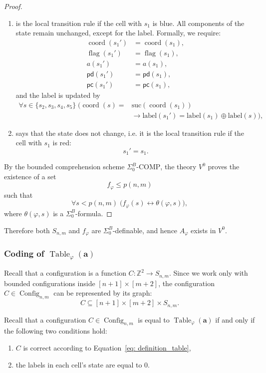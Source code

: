 \documentclass{article}
\theoremstyle{plain}
\theoremstyle{definition}
\DeclareMathOperator{\Config}{Config}
\DeclareMathOperator{\Table}{Table}
\DeclareMathOperator{\flag}{flag}
\DeclareMathOperator{\coord}{coord}
\newcommand{\pc}{\mathsf{pc}}
\newcommand{\pd}{\mathsf{pd}}
\newcommand{\tuple}{\mathbf}
\begin{document}
\begin{proof}
\begin{enumerate}[label={(\arabic*)}]
\item is the local transition rule if the cell with $s_1$ is blue. All components of the state remain unchanged, except for the label. 
Formally, we require:
\begin{align*}
    \coord(s_1') &= \coord(s_1),\\
    \flag(s_1') &= \flag(s_1),\\
    a(s_1') &= a(s_1),\\
    \pd(s_1') &= \pd(s_1),\\
    \pc(s_1') &= \pc(s_1),
\end{align*}
and the label is updated by
\begin{align*}
    \forall s \in \{s_2, s_3, s_4, s_5 \} \; \bigl(\coord(s)= & \mathrm{suc}(\coord(s_1)) \\& \rightarrow \mathrm{label}(s_1') 
    = \mathrm{label}(s_1) \oplus \mathrm{label}(s)\bigr),
\end{align*}

\item says that  the state does not change, i.e. it is the local transition rule if the cell with $s_1$ is red:
\[
s_1' = s_1.
\]
\end{enumerate}

By the bounded comprehension scheme $\Sigma^B_0\text{-COMP}$,
the theory $V^0$ proves the existence of a set
\[
f_\varphi \le p(n,m)
\]
such that
\[
\forall s < p(n,m)\;
\bigl(f_\varphi(s) \leftrightarrow \theta(\varphi, s)\bigr),
\]
where $\theta(\varphi, s)$ is a $\Sigma^B_0$-formula.
\end{proof}


Therefore both $S_{n,m}$ and $f_\varphi$ are $\Sigma^B_0$-definable, and hence $A_\varphi$ exists in $V^0$.


\subsubsection{Coding of $\Table_\varphi(\tuple a)$}\label{subsub:coding_table_af}

Recall that a configuration is a function $C : \mathbb{Z}^2 \to S_{n,m}$. Since we work only with bounded configurations inside $[n+1]\times[m+2]$, the configuration $C \in \Config_{n,m}$ can be represented by its graph:
\[
C \subseteq [n+1]\times[m+2]\times S_{n,m}.
\]



Recall that a configuration $C \in \Config_{n,m}$ is equal to
$\Table_\varphi(\tuple a)$ if and only if the following two conditions hold:
\begin{enumerate}
    \item $C$ is correct according to Equation~\ref{eq: definition_table},
    \item the labels in each cell's state are equal to $0$.
\end{enumerate}
\end{document}
